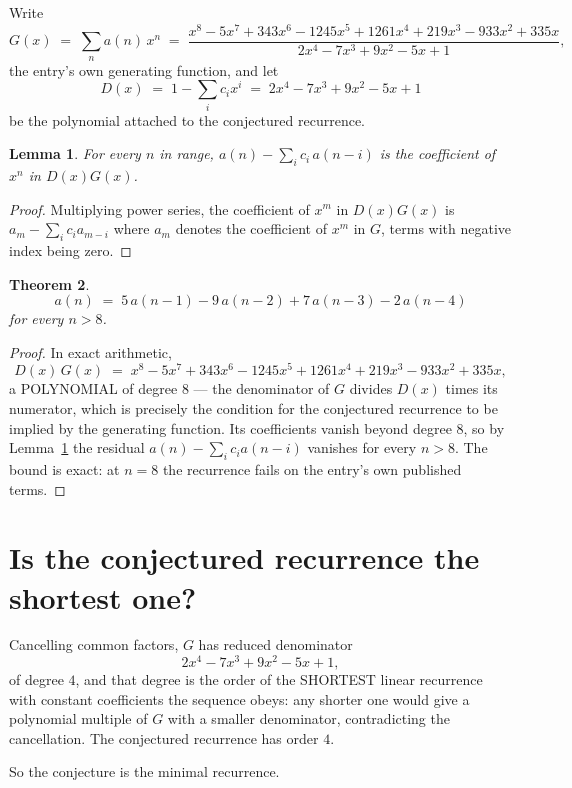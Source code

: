\documentclass[11pt,a4paper]{article}
\theoremstyle{plain}
\newtheorem{theorem}{Theorem}
\newtheorem{lemma}[theorem]{Lemma}
\theoremstyle{definition}
\begin{document}
Write
\[
G(x)\;=\;\sum_{n}a(n)\,x^{n}\;=\;\frac{x^{8} - 5 x^{7} + 343 x^{6} - 1245 x^{5} + 1261 x^{4} + 219 x^{3} - 933 x^{2} + 335 x}{2 x^{4} - 7 x^{3} + 9 x^{2} - 5 x + 1},
\]
the entry's own generating function, and let
\[
D(x)\;=\;1-\sum_i c_i x^{i}\;=\;2 x^{4} - 7 x^{3} + 9 x^{2} - 5 x + 1
\]
be the polynomial attached to the conjectured recurrence.

\begin{lemma}\label{lem:key}
For every $n$ in range, $a(n)-\sum_i c_i\,a(n-i)$ is the coefficient of $x^{n}$ in
$D(x)G(x)$.
\end{lemma}

\begin{proof}
Multiplying power series, the coefficient of $x^{m}$ in $D(x)G(x)$ is
$a_m-\sum_i c_i a_{m-i}$ where $a_m$ denotes the coefficient of $x^{m}$ in $G$, terms with
negative index being zero.
\end{proof}

\begin{theorem}
\[
a(n)\;=\;5\,a(n-1) - 9\,a(n-2) + 7\,a(n-3) - 2\,a(n-4)
\]
for every $n>8$.
\end{theorem}

\begin{proof}
In exact arithmetic,
\[
D(x)\,G(x)\;=\;x^{8} - 5 x^{7} + 343 x^{6} - 1245 x^{5} + 1261 x^{4} + 219 x^{3} - 933 x^{2} + 335 x,
\]
a POLYNOMIAL of degree $8$ --- the denominator of $G$ divides $D(x)$ times its numerator,
which is precisely the condition for the conjectured recurrence to be implied by the
generating function. Its coefficients vanish beyond degree $8$, so by
Lemma~\ref{lem:key} the residual $a(n)-\sum_ic_ia(n-i)$ vanishes for every
$n>8$. The bound is exact: at $n=8$ the recurrence fails on the entry's own published terms.
\end{proof}

\section{Is the conjectured recurrence the shortest one?}

Cancelling common factors, $G$ has reduced denominator
\[
2 x^{4} - 7 x^{3} + 9 x^{2} - 5 x + 1,
\]
of degree $4$, and that degree is the order of the SHORTEST linear recurrence with
constant coefficients the sequence obeys: any shorter one would give a polynomial multiple of
$G$ with a smaller denominator, contradicting the cancellation. The conjectured recurrence has
order $4$.

So the conjecture is the minimal recurrence.
\end{document}
